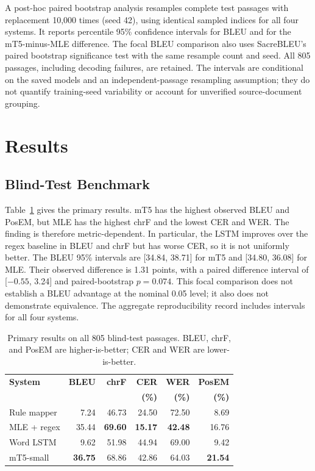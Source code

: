\documentclass[runningheads]{llncs}
\begin{document}
A post-hoc paired bootstrap analysis \citep{koehn-2004-statistical} resamples complete test passages with replacement 10,000 times (seed 42), using identical sampled indices for all four systems. It reports percentile 95\% confidence intervals for BLEU and for the mT5-minus-MLE difference. The focal BLEU comparison also uses SacreBLEU's paired bootstrap significance test with the same resample count and seed. All 805 passages, including decoding failures, are retained. The intervals are conditional on the saved models and an independent-passage resampling assumption; they do not quantify training-seed variability or account for unverified source-document grouping.

\section{Results}

\subsection{Blind-Test Benchmark}

Table~\ref{tab:main-results} gives the primary results. mT5 has the highest observed BLEU and PosEM, but MLE has the highest chrF and the lowest CER and WER. The finding is therefore metric-dependent. In particular, the LSTM improves over the regex baseline in BLEU and chrF but has worse CER, so it is not uniformly better. The BLEU 95\% intervals are [34.84, 38.71] for mT5 and [34.80, 36.08] for MLE. Their observed difference is 1.31 points, with a paired difference interval of [$-0.55$, 3.24] and paired-bootstrap $p=0.074$. This focal comparison does not establish a BLEU advantage at the nominal 0.05 level; it also does not demonstrate equivalence. The aggregate reproducibility record includes intervals for all four systems.

\begin{table}[H]
\centering
\caption{Primary results on all 805 blind-test passages. BLEU, chrF, and PosEM are higher-is-better; CER and WER are lower-is-better.}
\label{tab:main-results}
\small
\setlength{\tabcolsep}{4pt}
\begin{tabular}{lrrrrr}
\toprule
\textbf{System} & \textbf{BLEU} & \textbf{chrF} & \textbf{CER} & \textbf{WER} & \textbf{PosEM} \\
 & & & \textbf{(\%)} & \textbf{(\%)} & \textbf{(\%)} \\
\midrule
Rule mapper & 7.24 & 46.73 & 24.50 & 72.50 & 8.69 \\
MLE + regex & 35.44 & \textbf{69.60} & \textbf{15.17} & \textbf{42.48} & 16.76 \\
Word LSTM & 9.62 & 51.98 & 44.94 & 69.00 & 9.42 \\
mT5-small & \textbf{36.75} & 68.86 & 42.86 & 64.03 & \textbf{21.54} \\
\bottomrule
\end{tabular}
\end{table}
\end{document}
